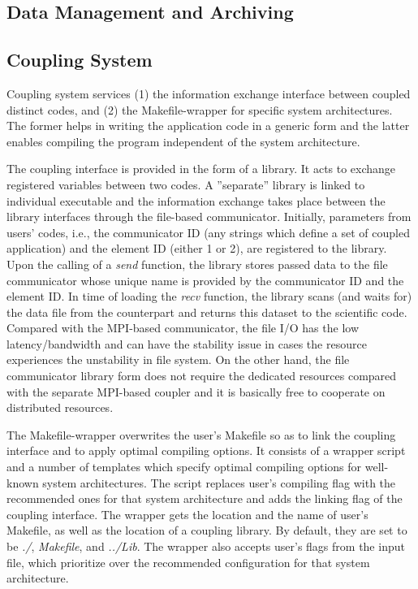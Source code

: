 \documentclass[10pt,conference]{IEEEtran}
\begin{document}
\subsection{Data Management and Archiving}

\subsection{Coupling System}
Coupling system services (1) the information exchange interface between coupled distinct codes, and (2) the Makefile-wrapper for specific system architectures. The former helps in writing the application code in a generic form and the latter enables compiling the program independent of the system architecture.

The coupling interface is provided in the form of a library. It acts to exchange registered variables between two codes. A ''separate'' library is linked to individual executable and the information exchange takes place between the library interfaces through the file-based communicator. Initially, parameters from users' codes, i.e., the communicator ID (any strings which define a set of coupled application) and the element ID (either 1 or 2), are registered to the library. Upon the calling of a \textit{send} function, the library stores passed data to the file communicator whose unique name is provided by the communicator ID and the element ID. In time of loading the \textit{recv} function, the library scans (and waits for) the data file from the counterpart and returns this dataset to the scientific code. Compared with the MPI-based communicator, the file I/O has the low latency/bandwidth and can have the stability issue in cases the resource experiences the unstability in file system. On the other hand, the file communicator library form does not require the dedicated resources compared with the separate MPI-based coupler and it is basically free to cooperate on distributed resources.

The Makefile-wrapper overwrites the user's Makefile so as to link the coupling interface and to apply optimal compiling options. It consists of a wrapper script and a number of templates which specify optimal compiling options for well-known system architectures. The script replaces user's compiling flag with the recommended ones for that system architecture and adds the linking flag of the coupling interface. The wrapper gets the location and the name of user's Makefile, as well as the location of a coupling library. By default, they are set to be \textit{./}, \textit{Makefile}, and \textit{../Lib}. The wrapper also accepts user's flags from the input file, which prioritize over the recommended configuration for that system architecture.
\end{document}

